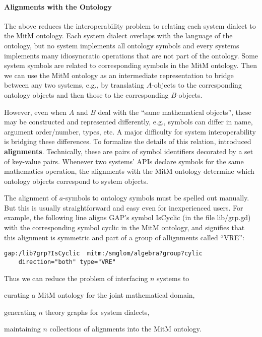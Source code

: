 
\paragraph{Alignments with the Ontology}
The above reduces the interoperability problem to relating each system dialect to the MitM ontology.
Each system dialect overlaps with the language of the ontology, but no system implements all ontology symbols and every systems implements many idiosyncratic operations that are not part of the ontology.
Some system symbols are related to corresponding symbols in the MitM ontology. Then we can use the MitM ontology as an intermediate representation to bridge between any two systems, e.g., by translating $A$-objects to the corresponding ontology objects and then those to the corresponding $B$-objects.

However, even when $A$ and $B$ deal with the ``same mathematical objects'', these may be constructed and represented differently, e.g., symbols can differ in name,
argument order/number, types, etc.
A major difficulty for system interoperability is bridging these differences.
To formalize the details of this relation, \cite{MueGauKal:cacfms17} introduced \textbf{\OMMT alignments}.
Technically, these are pairs of \OMMT symbol identifiers decorated by a set of key-value pairs.
Whenever two systems' APIs declare symbols for the same mathematics operation, the alignments with the MitM ontology determine which ontology objects correspond to system objects.

The alignment of $a$-symbols to ontology symbols must be spelled out manually.
But this is usually straightforward and easy even for inexperienced users. For example, the following line aligns GAP's symbol \textsf{IsCyclic} (in the file lib/grp.gd) with the corresponding symbol \textsf{cyclic} in the MitM ontology, and signifies that this alignment is symmetric and part of a group of allignments called ``VRE'':

\begin{verbatim}
gap:/lib?grp?IsCyclic  mitm:/smglom/algebra?group?cylic
    direction="both" type="VRE"
\end{verbatim}

Thus we can reduce the problem of interfacing $n$ systems to
\begin{inparaenum}[\em i\rm)]
\item curating a MitM ontology for the joint mathematical domain,
\item generating $n$ theory graphs for system dialects,
\item maintaining $n$ collections of alignments into the MitM ontology.
\end{inparaenum}

